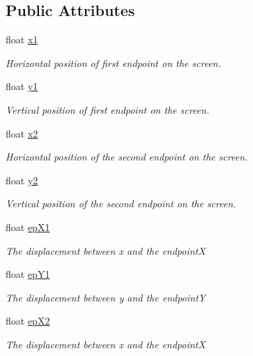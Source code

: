 \subsection*{Public Attributes}
\begin{DoxyCompactItemize}
\item 
float \hyperlink{classlighting_1_1LightBlocker_acb89235bf9b478b8242e0bf3a1ca863c}{x1}
\begin{DoxyCompactList}\small\item\em Horizontal position of first endpoint on the screen. \end{DoxyCompactList}\item 
float \hyperlink{classlighting_1_1LightBlocker_ad988b4727c60d6e83a8fca2d7eabbdec}{y1}
\begin{DoxyCompactList}\small\item\em Vertical position of first endpoint on the screen. \end{DoxyCompactList}\item 
float \hyperlink{classlighting_1_1LightBlocker_aaeb1641f4d28d66c4d89045c6053a29a}{x2}
\begin{DoxyCompactList}\small\item\em Horizontal position of the second endpoint on the screen. \end{DoxyCompactList}\item 
float \hyperlink{classlighting_1_1LightBlocker_a69fdb1256cab66b415a76b9f63af4284}{y2}
\begin{DoxyCompactList}\small\item\em Vertical position of the second endpoint on the screen. \end{DoxyCompactList}\item 
float \hyperlink{classlighting_1_1LightBlocker_a3c030005ee4af11838011f549ec0b4c3}{ep\+X1}
\begin{DoxyCompactList}\small\item\em The displacement between x and the endpointX \end{DoxyCompactList}\item 
float \hyperlink{classlighting_1_1LightBlocker_a2d8e512751df14bff73c59e3bfaea216}{ep\+Y1}
\begin{DoxyCompactList}\small\item\em The displacement between y and the endpointY \end{DoxyCompactList}\item 
float \hyperlink{classlighting_1_1LightBlocker_a01cf6b4663389c17b5f80294a2b26401}{ep\+X2}
\begin{DoxyCompactList}\small\item\em The displacement between x and the endpointX \end{DoxyCompactList}\item 

\end{DoxyCompactItemize}
